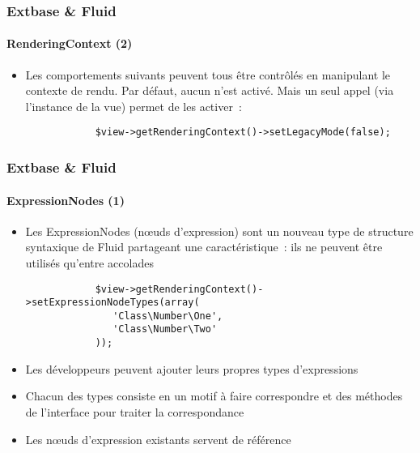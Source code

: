 \begin{frame}[fragile]
	\frametitle{Extbase \& Fluid}
	\framesubtitle{RenderingContext (2)}

	\lstset{basicstyle=\smaller\ttfamily}

	\begin{itemize}

		\item Les comportements suivants peuvent tous être contrôlés en manipulant
			le contexte de rendu. Par défaut, aucun n'est activé. Mais un seul appel
			(via l'instance de la vue) permet de les activer~:

		\begin{lstlisting}
			$view->getRenderingContext()->setLegacyMode(false);
		\end{lstlisting}

	\end{itemize}

\end{frame}


\begin{frame}[fragile]
	\frametitle{Extbase \& Fluid}
	\framesubtitle{ExpressionNodes (1)}

	\lstset{basicstyle=\smaller\ttfamily}

	\begin{itemize}

		\item Les ExpressionNodes (nœuds d'expression) sont un nouveau type
			de structure syntaxique de Fluid partageant une caractéristique~:
			ils ne peuvent être utilisés qu'entre accolades

		\begin{lstlisting}
			$view->getRenderingContext()->setExpressionNodeTypes(array(
			   'Class\Number\One',
			   'Class\Number\Two'
			));
		\end{lstlisting}

		\item Les développeurs peuvent ajouter leurs propres types d'expressions

		\item Chacun des types consiste en un motif à faire correspondre et des
			méthodes de l'interface pour traiter la correspondance

		\item Les nœuds d'expression existants servent de référence

	\end{itemize}

\end{frame}

